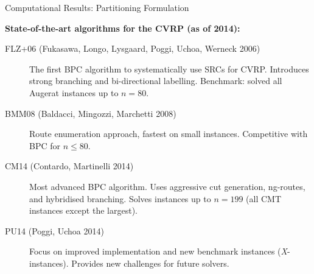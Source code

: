 \documentclass[aspectratio=169,10pt]{beamer}
\begin{document}
\begin{frame}[allowframebreaks]{Computational Results: Partitioning Formulation}
\framebreak

\textbf{State-of-the-art algorithms for the CVRP (as of 2014):}
\begin{description}
  \item[FLZ+06 (Fukasawa, Longo, Lysgaard, Poggi, Uchoa, Werneck 2006)]
        The first BPC algorithm to systematically use SRCs for CVRP.
        Introduces strong branching and bi-directional labelling.
        Benchmark: solved all Augerat instances up to $n=80$.
  \item[BMM08 (Baldacci, Mingozzi, Marchetti 2008)]
        Route enumeration approach, fastest on small instances.
        Competitive with BPC for $n \leq 80$.
  \item[CM14 (Contardo, Martinelli 2014)]
        Most advanced BPC algorithm. Uses aggressive cut generation,
        ng-routes, and hybridised branching. Solves instances up to
        $n = 199$ (all CMT instances except the largest).
  \item[PU14 (Poggi, Uchoa 2014)]
        Focus on improved implementation and new benchmark instances
        (\textit{X}-instances). Provides new challenges for future solvers.
\end{description}

\end{frame}
\end{document}
